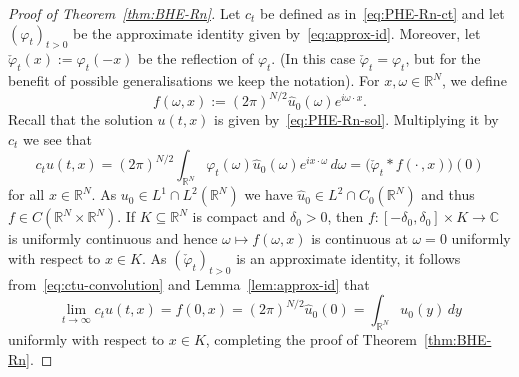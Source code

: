 \documentclass[a4paper, reqno,titlepage]{amsart}
\numberwithin{equation}{section}
\theoremstyle{plain}
\theoremstyle{definition}
\theoremstyle{remark}
\newcommand{\RR}{\mathbb{R}}
\newcommand{\CC}{\mathbb{C}}
\begin{document}
\begin{proof}[Proof of Theorem~\ref{thm:BHE-Rn}]
  Let $c_t$ be defined as in~\eqref{eq:PHE-Rn-ct} and let $(\varphi_t)_{t>0}$ be the approximate identity given by~\eqref{eq:approx-id}. Moreover, let $\check\varphi_t(x):=\varphi_t(-x)$ be the reflection of $\varphi_t$. (In this case $\check\varphi_t=\varphi_t$, but for the benefit of possible generalisations we keep the notation). For $x,\omega\in\RR^N$, we define
  \begin{equation*}
    f(\omega,x):=(2\pi)^{N/2}\widehat{u}_0(\omega)e^{i\omega\cdot x}.
  \end{equation*}
  Recall that the solution $u(t,x)$ is given by~\eqref{eq:PHE-Rn-sol}. Multiplying it by $c_t$ we see that
  \begin{equation}
    \label{eq:ctu-convolution}
    c_tu(t,x)
    =(2\pi)^{N/2}\int_{\RR^N}\varphi_t(\omega)\hat u_0(\omega)e^{ix\cdot\omega}\,d\omega
    =\bigl(\check\varphi_t*f(\cdot\,,x)\bigr)(0)
  \end{equation}
  for all $x\in\RR^N$. As $u_0\in L^1\cap L^2(\RR^N)$ we have $\widehat{u}_0\in L^2\cap C_0(\RR^N)$ and thus $f\in C(\RR^N\times\RR^N)$. If $K\subseteq\RR^N$ is compact and $\delta_0>0$, then $f\colon[-\delta_0,\delta_0]\times K\to\CC$ is uniformly continuous and hence $\omega\mapsto f(\omega,x)$ is continuous at $\omega=0$ uniformly with respect to $x\in K$. As $(\check\varphi_t)_{t>0}$ is an approximate identity, it follows from~\eqref{eq:ctu-convolution} and Lemma~\ref{lem:approx-id} that
  \begin{equation*}
    \lim_{t\to\infty}c_tu(t,x)
    =f(0,x)
    =(2\pi)^{N/2}\widehat{u}_0(0)
    =\int_{\RR^N}u_0(y)\,dy
  \end{equation*}
  uniformly with respect to $x\in K$, completing the proof of Theorem~\ref{thm:BHE-Rn}.
\end{proof}
\end{document}
